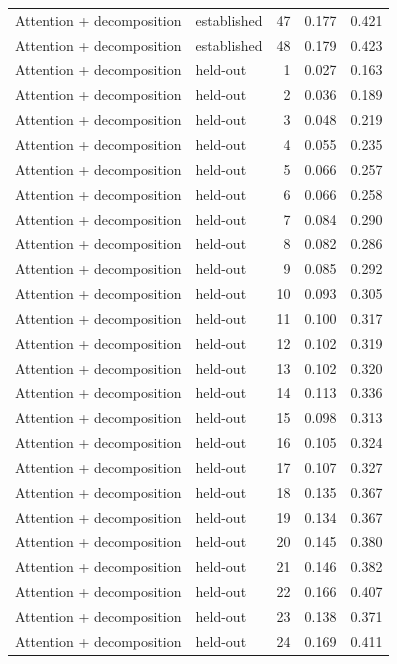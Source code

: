 \begin{tabular}{llrrr}
Attention + decomposition & established & 47 & 0.177 & 0.421 \\
Attention + decomposition & established & 48 & 0.179 & 0.423 \\
Attention + decomposition & held-out & 1 & 0.027 & 0.163 \\
Attention + decomposition & held-out & 2 & 0.036 & 0.189 \\
Attention + decomposition & held-out & 3 & 0.048 & 0.219 \\
Attention + decomposition & held-out & 4 & 0.055 & 0.235 \\
Attention + decomposition & held-out & 5 & 0.066 & 0.257 \\
Attention + decomposition & held-out & 6 & 0.066 & 0.258 \\
Attention + decomposition & held-out & 7 & 0.084 & 0.290 \\
Attention + decomposition & held-out & 8 & 0.082 & 0.286 \\
Attention + decomposition & held-out & 9 & 0.085 & 0.292 \\
Attention + decomposition & held-out & 10 & 0.093 & 0.305 \\
Attention + decomposition & held-out & 11 & 0.100 & 0.317 \\
Attention + decomposition & held-out & 12 & 0.102 & 0.319 \\
Attention + decomposition & held-out & 13 & 0.102 & 0.320 \\
Attention + decomposition & held-out & 14 & 0.113 & 0.336 \\
Attention + decomposition & held-out & 15 & 0.098 & 0.313 \\
Attention + decomposition & held-out & 16 & 0.105 & 0.324 \\
Attention + decomposition & held-out & 17 & 0.107 & 0.327 \\
Attention + decomposition & held-out & 18 & 0.135 & 0.367 \\
Attention + decomposition & held-out & 19 & 0.134 & 0.367 \\
Attention + decomposition & held-out & 20 & 0.145 & 0.380 \\
Attention + decomposition & held-out & 21 & 0.146 & 0.382 \\
Attention + decomposition & held-out & 22 & 0.166 & 0.407 \\
Attention + decomposition & held-out & 23 & 0.138 & 0.371 \\
Attention + decomposition & held-out & 24 & 0.169 & 0.411 \\

\end{tabular}
